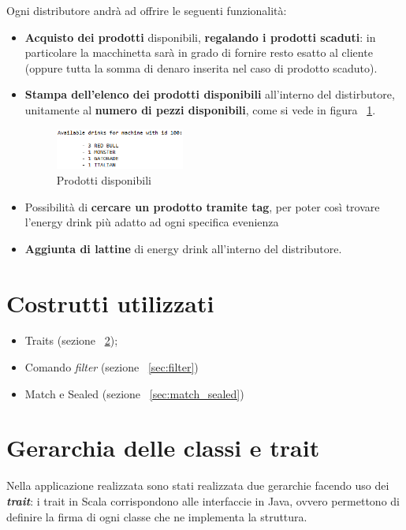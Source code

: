 Ogni distributore andrà ad offrire le seguenti funzionalità:
\begin{itemize}
	\item \textbf{Acquisto dei prodotti} disponibili, \textbf{regalando i prodotti scaduti}: in particolare la macchinetta sarà in grado di fornire resto esatto al cliente (oppure tutta la somma di denaro inserita nel caso di prodotto scaduto).
	\item \textbf{Stampa dell'elenco dei prodotti disponibili} all'interno del distirbutore, unitamente al \textbf{numero di pezzi disponibili}, come si vede in figura ~\ref{fig:AvailableProducts}.
	\begin{figure}[h]
		\centering
		\includegraphics[width=0.4\textwidth]{Immagini/ShowVendingMachine.png}
		\caption{Prodotti disponibili}
		\label{fig:AvailableProducts}
	\end{figure}
	\item Possibilità di \textbf{cercare un prodotto tramite tag}, per poter così trovare l'energy drink più adatto ad ogni specifica evenienza
	\item \textbf{Aggiunta di lattine} di energy drink all'interno del distributore.
\end{itemize}

\section{Costrutti utilizzati}
\begin{itemize}
	\item Traits (sezione ~\ref{sec:traits});
	\item Comando \textit{filter} (sezione ~\ref{sec:filter})
	\item Match e Sealed (sezione ~\ref{sec:match_sealed})
\end{itemize}

\newpage
\section{Gerarchia delle classi e trait}
\label{sec:traits}
Nella applicazione realizzata sono stati realizzata due gerarchie facendo uso dei \textit{\textbf{trait}}: i trait in Scala corrispondono alle interfaccie in Java, ovvero permettono di definire la firma di ogni classe che ne implementa la struttura.

